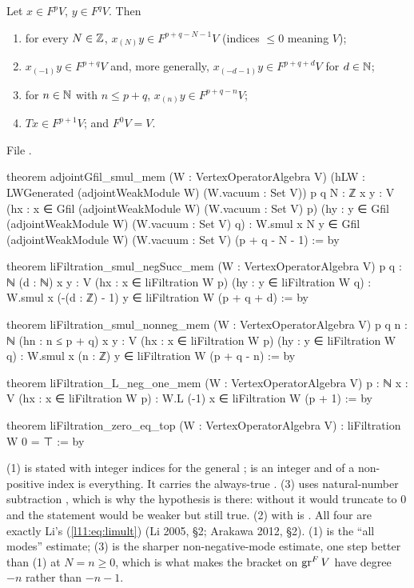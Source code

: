 \begin{theorem}\label{l11:thm:limult}
Let $x\in F^pV$, $y\in F^qV$. Then
\begin{enumerate}
\item for every $N\in{\mathbb{Z}}$, $x_{(N)}y\in F^{p+q-N-1}V$ (indices $\le0$ meaning $V$);
\item $x_{(-1)}y\in F^{p+q}V$ and, more generally, $x_{(-d-1)}y\in F^{p+q+d}V$ for $d\in{\mathbb{N}}$;
\item for $n\in{\mathbb{N}}$ with $n\le p+q$, $x_{(n)}y\in F^{p+q-n}V$;
\item $Tx\in F^{p+1}V$; and $F^0V = V$.
\end{enumerate}
\end{theorem}
\noindent File .
\begin{leancode}
theorem adjointGfil_smul_mem (W : VertexOperatorAlgebra V)
    (hLW : LWGenerated (adjointWeakModule W) ({W.vacuum} : Set V))
    {p q N : ℤ} {x y : V}
    (hx : x ∈ Gfil (adjointWeakModule W) ({W.vacuum} : Set V) p)
    (hy : y ∈ Gfil (adjointWeakModule W) ({W.vacuum} : Set V) q) :
    W.smul x N y ∈
      Gfil (adjointWeakModule W) ({W.vacuum} : Set V) (p + q - N - 1) := by

theorem liFiltration_smul_negSucc_mem (W : VertexOperatorAlgebra V)
    {p q : ℕ} (d : ℕ) {x y : V}
    (hx : x ∈ liFiltration W p) (hy : y ∈ liFiltration W q) :
    W.smul x (-(d : ℤ) - 1) y ∈ liFiltration W (p + q + d) := by

theorem liFiltration_smul_nonneg_mem (W : VertexOperatorAlgebra V)
    {p q n : ℕ} (hn : n ≤ p + q) {x y : V}
    (hx : x ∈ liFiltration W p) (hy : y ∈ liFiltration W q) :
    W.smul x (n : ℤ) y ∈ liFiltration W (p + q - n) := by

theorem liFiltration_L_neg_one_mem (W : VertexOperatorAlgebra V) {p : ℕ} {x : V}
    (hx : x ∈ liFiltration W p) : W.L (-1) x ∈ liFiltration W (p + 1) := by

theorem liFiltration_zero_eq_top (W : VertexOperatorAlgebra V) : liFiltration W 0 = ⊤ := by
\end{leancode}

\begin{dictionary}
(1) is stated with integer indices for the general ;  is an integer and
 of a non-positive index is everything. It carries the always-true . (3) uses
natural-number subtraction , which is why the hypothesis  is there:
without it  would truncate to $0$ and the statement would be weaker but still true. (2)
with  is \allowbreak{}\allowbreak{}\allowbreak{}\allowbreak{}. All four are exactly Li's (\ref{l11:eq:limult})
(Li 2005, §2; Arakawa 2012, §2). (1) is the ``all modes'' estimate; (3) is the sharper
non-negative-mode estimate, one step better than (1) at $N = n\ge0$, which is what makes the bracket on
$\operatorname{gr}^FV$ have degree $-n$ rather than $-n-1$.
\end{dictionary}

